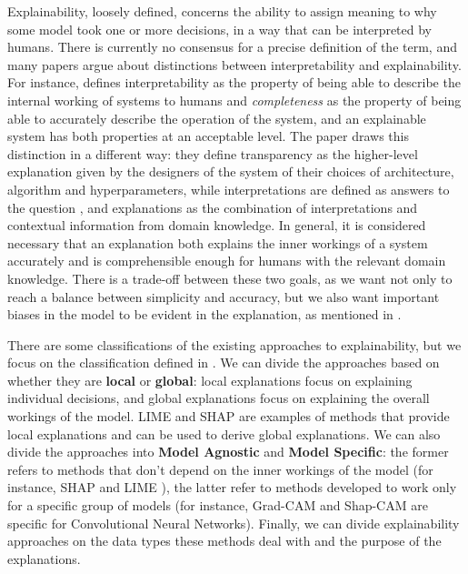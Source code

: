 Explainability, loosely defined, concerns the ability to assign meaning to why some model took one or more decisions, in a way that can be interpreted by humans. There is currently no consensus for a precise definition of the term, and many papers argue about distinctions between interpretability and explainability. For instance, \cite{gilpin2018explaining} defines interpretability as the property of being able to describe the internal working of systems to humans and \emph{completeness} as the property of being able to accurately describe the operation of the system, and an explainable system has both properties at an acceptable level. The paper \cite{roscher2020explainable} draws this distinction in a different way: they define transparency as the higher-level explanation given by the designers of the system of their choices of architecture, algorithm and hyperparameters, while interpretations are defined as answers to the question , and explanations as the combination of interpretations and contextual information from domain knowledge. In general, it is considered necessary that an explanation both explains the inner workings of a system accurately and is comprehensible enough for humans with the relevant domain knowledge. There is a trade-off between these two goals, as we want not only to reach a balance between simplicity and accuracy, but we also want important biases in the model to be evident in the explanation, as mentioned in \cite{gilpin2018explaining}.

There are some classifications of the existing approaches to explainability, but we focus on the classification defined in \cite{linardatos2020explainable}. We can divide the approaches based on whether they are \textbf{local} or \textbf{global}: local explanations focus on explaining individual decisions, and global explanations focus on explaining the overall workings of the model. LIME \cite{ribeiro2016should} and SHAP \cite{lundberg2017unified} are examples of methods that provide local explanations and can be used to derive global explanations. We can also divide the approaches into \textbf{Model Agnostic} and \textbf{Model Specific}: the former refers to methods that don't depend on the inner workings of the model (for instance, SHAP \cite{lundberg2017unified} and LIME \cite{ribeiro2016should}), the latter refer to methods developed to work only for a specific group of models (for instance, Grad-CAM and Shap-CAM are specific for Convolutional Neural Networks). Finally, we can divide explainability approaches on the data types these methods deal with and the purpose of the explanations.

